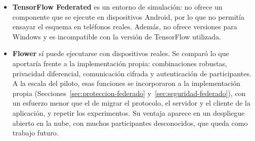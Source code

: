 \begin{itemize}
    \item \textbf{TensorFlow Federated} es un entorno de simulación: no ofrece un componente que se ejecute en dispositivos Android, por lo que no permitía ensayar el esquema en teléfonos reales. Además, no ofrece versiones para Windows y es incompatible con la versión de TensorFlow utilizada.
    \item \textbf{Flower} sí puede ejecutarse con dispositivos reales. Se comparó lo que aportaría frente a la implementación propia: combinaciones robustas, privacidad diferencial, comunicación cifrada y autenticación de participantes. A la escala del piloto, esas funciones se incorporaron a la implementación propia (Secciones~\ref{sec:proteccion-federado} y~\ref{sec:seguridad-federado}), con un esfuerzo menor que el de migrar el protocolo, el servidor y el cliente de la aplicación, y repetir los experimentos. Su ventaja aparece en un despliegue abierto en la nube, con muchos participantes desconocidos, que queda como trabajo futuro.
\end{itemize}
